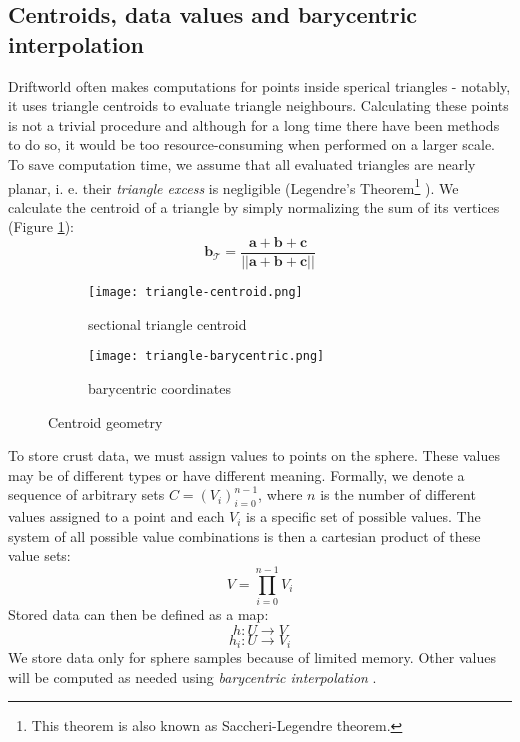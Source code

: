 \subsection{Centroids, data values and barycentric interpolation}
Driftworld often makes computations for points inside sperical triangles - notably, it uses triangle centroids to evaluate triangle neighbours. Calculating these points is not a trivial procedure and although for a long time there have been methods to do so, it would be too resource-consuming when performed on a larger scale. To save computation time, we assume that all evaluated triangles are nearly planar, i. e. their \textit{triangle excess} is negligible (Legendre's Theorem\footnote{This theorem is also known as Saccheri-Legendre theorem.} \cite{todhunter}). We calculate the centroid of a triangle by simply normalizing the sum of its vertices (Figure \ref{fig:triangle-centroid}):
$$\mathbf{b}_\mathcal{T}=\frac{\mathbf{a} + \mathbf{b} + \mathbf{c}}{||\mathbf{a} + \mathbf{b} + \mathbf{c}||}$$
\begin{figure}[ht]
\centering
\begin{subfigure}{7cm}
\texttt{[image: triangle-centroid.png]}
\caption{sectional triangle centroid}
\label{fig:triangle-centroid}
\end{subfigure}
\hspace*{1cm}
\begin{subfigure}{7cm}
\texttt{[image: triangle-barycentric.png]}
\caption{barycentric coordinates}
\label{fig:triangle-barycentric}
\end{subfigure}
\caption{Centroid geometry}
\label{fig:centroid-geometry}
\end{figure}

To store crust data, we must assign values to points on the sphere. These values may be of different types or have different meaning. Formally, we denote a sequence of arbitrary sets $C=\left(V_i\right)_{i=0}^{n-1}$, where $n$ is the number of different values assigned to a point and each $V_i$ is a specific set of possible values. The system of all possible value combinations is then a cartesian product of these value sets:
$$V=\prod_{i=0}^{n-1}V_i$$
Stored data can then be defined as a map:
$$h: U\rightarrow V$$
$$h_i: U\rightarrow V_i$$
We store data only for sphere samples because of limited memory. Other values will be computed as needed using \textit{barycentric interpolation} \cite{scratchapixel}.\newpage

